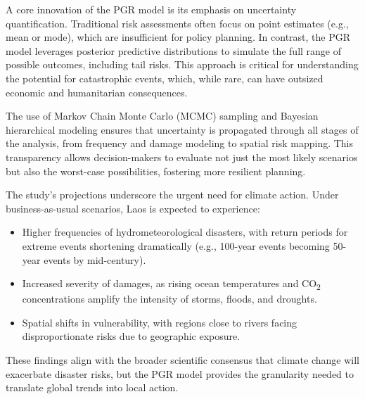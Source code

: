 A core innovation of the PGR model is its emphasis on uncertainty quantification. Traditional risk assessments often focus on point estimates (e.g., mean or mode), which are insufficient for policy planning. In contrast, the PGR model leverages posterior predictive distributions to simulate the full range of possible outcomes, including tail risks. This approach is critical for understanding the potential for catastrophic events, which, while rare, can have outsized economic and humanitarian consequences.

The use of Markov Chain Monte Carlo (MCMC) sampling and Bayesian hierarchical modeling ensures that uncertainty is propagated through all stages of the analysis, from frequency and damage modeling to spatial risk mapping. This transparency allows decision-makers to evaluate not just the most likely scenarios but also the worst-case possibilities, fostering more resilient planning.

The study's projections underscore the urgent need for climate action. Under business-as-usual scenarios, Laos is expected to experience:

\begin{itemize}
    \item Higher frequencies of hydrometeorological disasters, with return periods for extreme events shortening dramatically (e.g., 100-year events becoming 50-year events by mid-century).

    \item Increased severity of damages, as rising ocean temperatures and CO\textsubscript{2} concentrations amplify the intensity of storms, floods, and droughts.

    \item Spatial shifts in vulnerability, with regions close to rivers facing disproportionate risks due to geographic exposure.
\end{itemize}

These findings align with the broader scientific consensus that climate change will exacerbate disaster risks, but the PGR model provides the granularity needed to translate global trends into local action.
